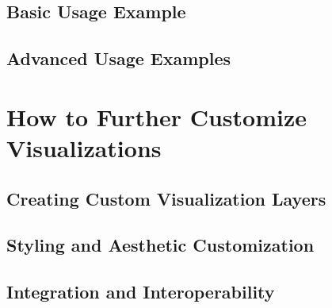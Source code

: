 \subsection{Basic Usage Example}



\subsection{Advanced Usage Examples}



\section{How to Further Customize Visualizations}



\subsection{Creating Custom Visualization Layers}



\subsection{Styling and Aesthetic Customization}



\subsection{Integration and Interoperability}


